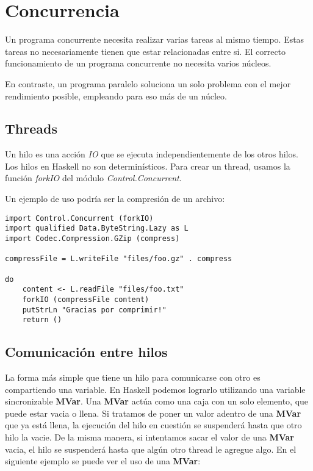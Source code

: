 

\section{Concurrencia} %
\label{sec:concurrencia}


Un programa concurrente necesita realizar varias tareas al mismo tiempo. Estas tareas no necesariamente tienen que estar relacionadas entre si. El correcto funcionamiento de un programa concurrente no necesita varios núcleos.

En contraste, un programa paralelo soluciona un solo problema con el mejor rendimiento posible, empleando para eso más de un núcleo.

\subsection{Threads} %
\label{ssub:threads}

Un hilo es una acción \textit{IO} que se ejecuta independientemente de los otros hilos. Los hilos en Haskell no son determinísticos.
Para crear un thread, usamos la función \textit{forkIO} del módulo \textit{Control.Concurrent}.

Un ejemplo de uso podría ser la compresión de un archivo:

\begin{lstlisting}
import Control.Concurrent (forkIO)
import qualified Data.ByteString.Lazy as L
import Codec.Compression.GZip (compress)

compressFile = L.writeFile "files/foo.gz" . compress

do
    content <- L.readFile "files/foo.txt"
    forkIO (compressFile content)
    putStrLn "Gracias por comprimir!"
    return ()
\end{lstlisting}


\subsection{Comunicación entre hilos} %
\label{ssub:comunicaci_n_entre_hilos}

La forma más simple que tiene un hilo para comunicarse con otro es compartiendo una variable. En Haskell podemos lograrlo utilizando una variable sincronizable \textbf{MVar}. Una \textbf{MVar} actúa como una caja con un solo elemento, que puede estar vacia o llena. Si tratamos de poner un valor adentro de una \textbf{MVar} que ya está llena, la ejecución del hilo en cuestión se suspenderá hasta que otro hilo la vacie. De la misma manera, si intentamos sacar el valor de una \textbf{MVar} vacia, el hilo se suspenderá hasta que algún otro thread le agregue algo. En el siguiente ejemplo se puede ver el uso de una \textbf{MVar}:

